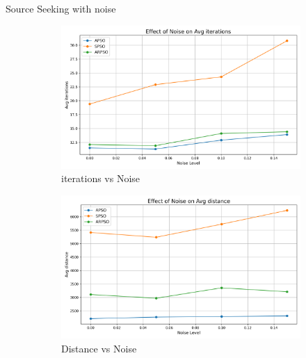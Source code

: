 \documentclass[aspectratio=169]{beamer}
\begin{document}
\begin{frame}{Source Seeking with noise}    
    \begin{figure}[h]
        \centering
        \begin{subfigure}[b]{0.32\textwidth}
            \centering
            \includegraphics[width=\textwidth]{../plots/r1_with_noise/avg_iterations_vs_noise.png}
            \caption{iterations vs Noise}
        \end{subfigure}
        \hfill
        \begin{subfigure}[b]{0.32\textwidth}
            \centering
            \includegraphics[width=\textwidth]{../plots/r1_with_noise/avg_distance_vs_noise.png}
            \caption{Distance vs Noise}
        \end{subfigure}
        \hfill
        \begin{subfigure}[b]{0.32\textwidth}
            \centering

\end{subfigure}
\end{figure}
\end{frame}
\end{document}
